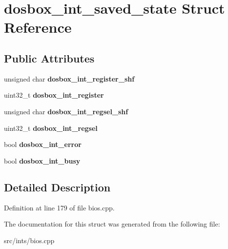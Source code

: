 \hypertarget{structdosbox__int__saved__state}{\section{dosbox\-\_\-int\-\_\-saved\-\_\-state Struct Reference}
\label{structdosbox__int__saved__state}
}
\subsection*{Public Attributes}
\begin{DoxyCompactItemize}
\item 
\hypertarget{structdosbox__int__saved__state_a3190dad41dc7ebdb7a5e478c37fba33e}{unsigned char {\bfseries dosbox\-\_\-int\-\_\-register\-\_\-shf}}\label{structdosbox__int__saved__state_a3190dad41dc7ebdb7a5e478c37fba33e}

\item 
\hypertarget{structdosbox__int__saved__state_a4cf4d84310e8ea530f67d12b6dd47aca}{uint32\-\_\-t {\bfseries dosbox\-\_\-int\-\_\-register}}\label{structdosbox__int__saved__state_a4cf4d84310e8ea530f67d12b6dd47aca}

\item 
\hypertarget{structdosbox__int__saved__state_a8baf767617af9ec07f8179944c14d327}{unsigned char {\bfseries dosbox\-\_\-int\-\_\-regsel\-\_\-shf}}\label{structdosbox__int__saved__state_a8baf767617af9ec07f8179944c14d327}

\item 
\hypertarget{structdosbox__int__saved__state_a22e6fa7e3be634cbbc53513c894a9612}{uint32\-\_\-t {\bfseries dosbox\-\_\-int\-\_\-regsel}}\label{structdosbox__int__saved__state_a22e6fa7e3be634cbbc53513c894a9612}

\item 
\hypertarget{structdosbox__int__saved__state_ad5b90f6e340dc6be7d0f6c1cd9c24056}{bool {\bfseries dosbox\-\_\-int\-\_\-error}}\label{structdosbox__int__saved__state_ad5b90f6e340dc6be7d0f6c1cd9c24056}

\item 
\hypertarget{structdosbox__int__saved__state_a61744b295bdc81881e4d05f2bd22f194}{bool {\bfseries dosbox\-\_\-int\-\_\-busy}}\label{structdosbox__int__saved__state_a61744b295bdc81881e4d05f2bd22f194}

\end{DoxyCompactItemize}


\subsection{Detailed Description}


Definition at line 179 of file bios.\-cpp.



The documentation for this struct was generated from the following file\-:\begin{DoxyCompactItemize}
\item 
src/ints/bios.\-cpp\end{DoxyCompactItemize}
